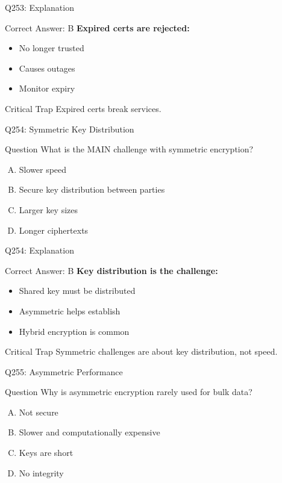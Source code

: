 \documentclass{beamer}
\begin{document}
	\begin{frame}{Q253: Explanation}
		\begin{block}{Correct Answer: B}
			\textbf{Expired certs are rejected:}
			\begin{itemize}
				\item No longer trusted
				\item Causes outages
				\item Monitor expiry
			\end{itemize}
		\end{block}
		\begin{alertblock}{Critical Trap}
			Expired certs break services.
		\end{alertblock}
	\end{frame}
	
	\begin{frame}{Q254: Symmetric Key Distribution}
		\begin{block}{Question}
			What is the MAIN challenge with symmetric encryption?
		\end{block}
		\begin{enumerate}[(A)]
			\item Slower speed
			\item Secure key distribution between parties
			\item Larger key sizes
			\item Longer ciphertexts
		\end{enumerate}
	\end{frame}
	
	\begin{frame}{Q254: Explanation}
		\begin{block}{Correct Answer: B}
			\textbf{Key distribution is the challenge:}
			\begin{itemize}
				\item Shared key must be distributed
				\item Asymmetric helps establish
				\item Hybrid encryption is common
			\end{itemize}
		\end{block}
		\begin{alertblock}{Critical Trap}
			Symmetric challenges are about key distribution, not speed.
		\end{alertblock}
	\end{frame}
	
	\begin{frame}{Q255: Asymmetric Performance}
		\begin{block}{Question}
			Why is asymmetric encryption rarely used for bulk data?
		\end{block}
		\begin{enumerate}[(A)]
			\item Not secure
			\item Slower and computationally expensive
			\item Keys are short
			\item No integrity
		\end{enumerate}
	\end{frame}
	
\end{document}
